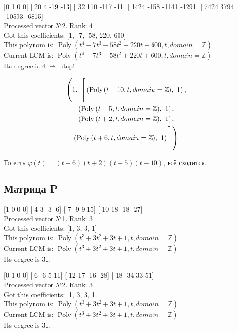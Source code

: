 \documentclass[12pt, a4paper]{article}
\begin{document}
    [0 1 0 0] [ 20   4 -19 -13] [  32  110 -117  -11] [ 1424  -158 -1141 -1291] [  7424   3794 -10593  -6815] \\
    Processed vector №2. Rank: 4\\
    Got this coefficients: [1, -7, -58, 220, 600]\\
    This polynom is: $\operatorname{Poly}{\left( t^{4} - 7 t^{3} - 58 t^{2} + 220 t + 600, t, domain=\mathbb{Z} \right)}$\\
    Current LCM is: $\operatorname{Poly}{\left( t^{4} - 7 t^{3} - 58 t^{2} + 220 t + 600, t, domain=\mathbb{Z} \right)}$\\
    Its degree is 4 $\Rightarrow$ stop!
    
    \begin{multline}
        \biggg( 1, \  \biggg[ 
            \left( \operatorname{Poly}{\left( t - 10, t, domain=\mathbb{Z} \right)}, \  1\right), \\
            \left( \operatorname{Poly}{\left( t - 5, t, domain=\mathbb{Z} \right)}, \  1\right), \\
            \left( \operatorname{Poly}{\left( t + 2, t, domain=\mathbb{Z} \right)}, \  1\right), \\
            \left( \operatorname{Poly}{\left( t + 6, t, domain=\mathbb{Z} \right)}, \  1\right)
            \biggg]\biggg)
    \end{multline}
    
    То есть $\varphi(t) = (t + 6)(t + 2)(t - 5)(t- 10)$, всё сходится.

    \subsection{Матрица P}

    [1 0 0 0] [-4  3 -3 -6] [ 7 -9  9 15] [-10  18 -18 -27] \\
    Processed vector №1. Rank: 3\\
    Got this coefficients: [1, 3, 3, 1]\\
    This polynom is: $\operatorname{Poly}{\left( t^{3} + 3 t^{2} + 3 t + 1, t, domain=\mathbb{Z} \right)}$\\
    Current LCM is: $\operatorname{Poly}{\left( t^{3} + 3 t^{2} + 3 t + 1, t, domain=\mathbb{Z} \right)}$\\
    Its degree is 3…

    [0 1 0 0] [ 6 -6  5 11] [-12  17 -16 -28] [ 18 -34  33  51] \\
    Processed vector №2. Rank: 3\\
    Got this coefficients: [1, 3, 3, 1]\\
    This polynom is: $\operatorname{Poly}{\left( t^{3} + 3 t^{2} + 3 t + 1, t, domain=\mathbb{Z} \right)}$\\
    Current LCM is: $\operatorname{Poly}{\left( t^{3} + 3 t^{2} + 3 t + 1, t, domain=\mathbb{Z} \right)}$\\
    Its degree is 3…
\end{document}
